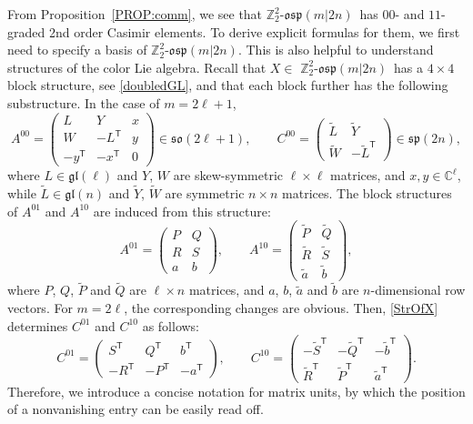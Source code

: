 \documentclass[10pt,a4paper]{amsart}
\numberwithin{equation}{section}
\theoremstyle{definition}
\def\Z2{\mathbb{Z}_2^2}
\def\osp{\mathfrak{osp}}
\def\gl{\mathfrak{gl}}
\def\so{\mathfrak{so}}
\def\sp{\mathfrak{sp}}
\def\Zosp{$\Z2$-$\osp(m|2n)$}
\begin{document}
From Proposition~\ref{PROP:comm}, we see that \Zosp\ has $00$- and $11$-graded 2nd order Casimir elements.
To derive explicit formulas for them, we first need to specify a basis of \Zosp.
This is also helpful to understand structures of the color Lie algebra.
Recall that $ X \in $ \Zosp\ has a $ 4 \times 4 $ block structure, see \eqref{doubledGL}, and that each block further has the following substructure.
In the case of $ m = 2\ell+1$,
\begin{equation*}
	A^{00} =
	\begin{pmatrix}
		L & Y & x
		\\
		W & -L^{\mathsf{T}} & y
		\\
		-y^{\mathsf{T}} & -x^{\mathsf{T}} & 0
	\end{pmatrix}
	\in \so(2\ell+1), \qquad
	C^{00} =
	\begin{pmatrix}
		\tilde{L} & \tilde{Y} \\ \tilde{W} & -\tilde{L}^{\mathsf{T}}
	\end{pmatrix}
	\in \sp(2n),
\end{equation*}
where $ L \in \gl(\ell)$ and $ Y$, $W $ are skew-symmetric $\ell \times \ell $ matrices, and $ x, y \in \mathbb{C}^{\ell}$,
while $\tilde{L} \in \gl(n)$ and $ \tilde{Y}$, $\tilde{W}$ are symmetric $ n \times n $ matrices.
The block structures of $A^{01}$ and $A^{10}$ are induced from this structure:
\begin{equation*}
	A^{01} =
	\begin{pmatrix}
		P & Q \\ R & S \\
		a & b
	\end{pmatrix},
	\qquad
	A^{10} =
	\begin{pmatrix}
		\tilde{P} & \tilde{Q} \\ \tilde{R} & \tilde{S} \\
		\tilde{a} & \tilde{b}
	\end{pmatrix},
\end{equation*}
where $ P$, $Q$, $\tilde{P}$ and $\tilde{Q} $ are $ \ell \times n $ matrices, and $ a$, $b$, $\tilde{a} $ and $\tilde{b} $ are $n$-dimensional row vectors.
For $m = 2\ell$, the corresponding changes are obvious.
Then, \eqref{StrOfX} determines $ C^{01}$ and $ C^{10}$ as follows:%
\begin{equation*}
	C^{01}
	=
	\begin{pmatrix}
		S^{\mathsf{T}} & Q^{\mathsf{T}} & b^{\mathsf{T}} \\
		-R^{\mathsf{T}} & -P^{\mathsf{T}} & -a^{\mathsf{T}}
	\end{pmatrix},
	\qquad
	C^{10} =
	\begin{pmatrix}
		-\tilde{S}^{\mathsf{T}} & - \tilde{Q}^{\mathsf{T}} & -\tilde{b}^{\mathsf{T}}
		\\
		\tilde{R}^{\mathsf{T}} & \tilde{P}^{\mathsf{T}} & \tilde{a}^{\mathsf{T}}
	\end{pmatrix}.
\end{equation*}
Therefore, we introduce a concise notation for matrix units, by which the position of a nonvanishing entry can be easily read off.
\end{document}
